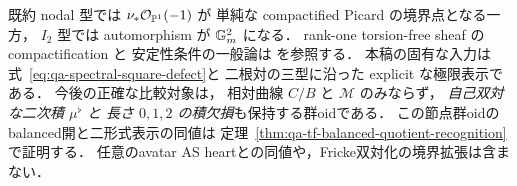 \begin{remark}
\label{rem:qa-spectral-compactification-choice}
既約 nodal 型では $\nu_*\mathcal O_{\mathbb P^1}(-1)$ が
単純な compactified Picard の境界点となる一方，
$I_2$ 型では automorphism が $\mathbb G_m^2$ になる．
rank-one torsion-free sheaf の compactification と
安定性条件の一般論は
\cite{AltmanKleiman1980,ChristPayneShen2023} を参照する．
本稿の固有な入力は式~\eqref{eq:qa-spectral-square-defect}と
二根対の三型に沿った explicit な極限表示である．
今後の正確な比較対象は，
相対曲線 $C/B$ と $\mathcal M$ のみならず，
\emph{自己双対な二次積 $\mu^\flat$ と
長さ $0,1,2$ の積欠損}も保持する群oidである．
この節点群oidのbalanced開と二形式表示の同値は
定理~\ref{thm:qa-tf-balanced-quotient-recognition}で証明する．
任意のavatar AS heartとの同値や，Fricke双対化の境界拡張は含まない．
\end{remark}
